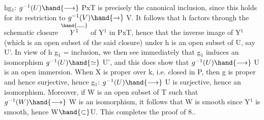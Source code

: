 

hg$_1$: $g^{-1}(U) \hand{\longrightarrow}$ PxT is precisely the canonical inclusion, since
this holds for its restriction to $g^{-1}(V) \hand{\rightarrow}$ V. 
 It follows that h  factors
through the schematic closure  $\overset{\hand{\rule{1.1em}{0.35pt}}}{Y^1}$ of Y$^1$ in PxT, hence that
the inverse image of Y$^1$ (which is an open subset of the said closure) under h
is an open subset of U, say U'. In view of h g$_1$ = inclusion, we
then see immediately that g$_1$ induces an isomorphism $g^{-1}(U) \hand{\simeq}$ U', and
 this does show that $g^{-1}(U) \hand{\longrightarrow}$ U is an open immersion.
When X is proper over k, i.e. closed in P, then g is proper and hence
surjective, hence g$_1$: $g^{-1}(U) \hand{\longrightarrow}$ U is surjective, hence an isomorphism.
Moreover, if W is an open subset of T such that $g^{-1}(W) \hand{\longrightarrow}$ W is an isomorphism,
it follows that W is smooth since Y$^1$ is smooth, hence W$\hand{\subset}$U.
This completes the proof of 8..

